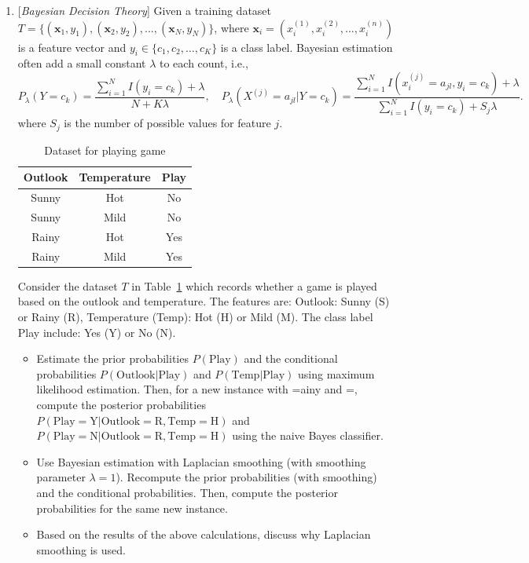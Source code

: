 \documentclass[10pt]{article}
\begin{document}
\begin{enumerate}
\newpage


\item {} {[}\textit{Bayesian Decision Theory}{]}
		Given a training dataset $T = \{(\mathbf{x}_1, y_1), (\mathbf{x}_2, y_2), \ldots, (\mathbf{x}_N, y_N)\}$, where $\mathbf{x}_i = (x_i^{(1)}, x_i^{(2)}, \ldots, x_i^{(n)})$ is a feature vector and $y_i \in \{c_1, c_2, \ldots, c_K\}$ is a class label. Bayesian estimation often add a small constant $\lambda$ to each count, i.e., 
		\[
		P_{\lambda}(Y = c_k) = \frac{\sum_{i=1}^N I(y_i = c_k) + \lambda}{N + K \lambda},\quad P_{\lambda}(X^{(j)} = a_{jl} | Y = c_k) = \frac{\sum_{i=1}^N I(x_i^{(j)} = a_{jl}, y_i = c_k) + \lambda}{\sum_{i=1}^N I(y_i = c_k) + S_j \lambda}.
		\]
		where $S_j$ is the number of possible values for feature $j$.
		
		\begin{table}[h]
			\centering
			\caption{Dataset for playing game}
			\label{tab:dataset}
			\begin{tabular}{ccc}
				\toprule
				Outlook & Temperature & Play \\
				\midrule
				Sunny & Hot & No \\
				Sunny & Mild & No \\
				Rainy & Hot & Yes \\
				Rainy & Mild & Yes \\
				\bottomrule
			\end{tabular}
		\end{table}
		
		Consider the dataset \( T \) in Table~\ref{tab:dataset} which records whether a game is played based on the outlook and temperature. The features are: Outlook: Sunny (S) or Rainy (R), Temperature (Temp): Hot (H) or Mild (M). The class label Play include: Yes (Y) or No (N). 
		
		\begin{itemize}
			\item[(a)] Estimate the prior probabilities \( P(\text{Play}) \) and the conditional probabilities \( P(\text{Outlook} | \text{Play}) \) and \( P(\text{Temp} | \text{Play}) \) using maximum likelihood estimation. Then, for a new instance with =ainy and =, compute the posterior probabilities \( P(\text{Play}=\text{Y} | \text{Outlook}=\text{R}, \text{Temp}=\text{H}) \) and \( P(\text{Play}=\text{N} | \text{Outlook}=\text{R}, \text{Temp}=\text{H}) \) using the naive Bayes classifier. 
			\item[(b)] Use Bayesian estimation with Laplacian smoothing (with smoothing parameter \( \lambda = 1 \)). Recompute the prior probabilities (with smoothing) and the conditional probabilities. Then, compute the posterior probabilities for the same new instance. 
			\item[(c)] Based on the results of the above calculations, discuss why Laplacian smoothing is used. 
		\end{itemize}
\end{enumerate}
\end{document}

